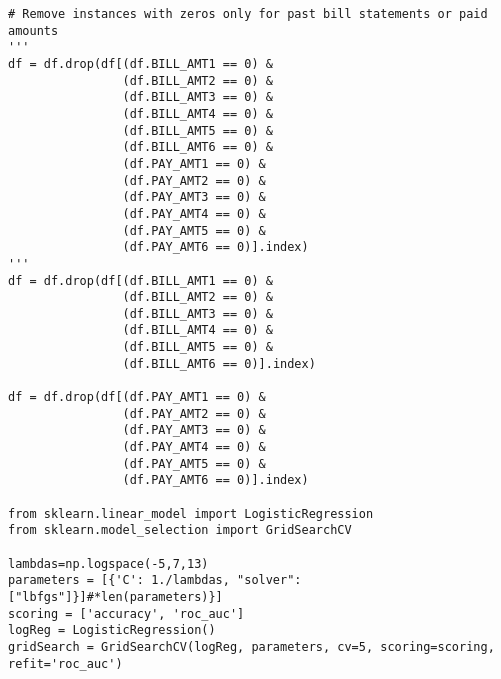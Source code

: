 \documentclass[%
oneside,                 %
final,                   %
10pt]{article}
\begin{document}
\begin{verbatim}
# Remove instances with zeros only for past bill statements or paid amounts
'''
df = df.drop(df[(df.BILL_AMT1 == 0) &
                (df.BILL_AMT2 == 0) &
                (df.BILL_AMT3 == 0) &
                (df.BILL_AMT4 == 0) &
                (df.BILL_AMT5 == 0) &
                (df.BILL_AMT6 == 0) &
                (df.PAY_AMT1 == 0) &
                (df.PAY_AMT2 == 0) &
                (df.PAY_AMT3 == 0) &
                (df.PAY_AMT4 == 0) &
                (df.PAY_AMT5 == 0) &
                (df.PAY_AMT6 == 0)].index)
'''
df = df.drop(df[(df.BILL_AMT1 == 0) &
                (df.BILL_AMT2 == 0) &
                (df.BILL_AMT3 == 0) &
                (df.BILL_AMT4 == 0) &
                (df.BILL_AMT5 == 0) &
                (df.BILL_AMT6 == 0)].index)

df = df.drop(df[(df.PAY_AMT1 == 0) &
                (df.PAY_AMT2 == 0) &
                (df.PAY_AMT3 == 0) &
                (df.PAY_AMT4 == 0) &
                (df.PAY_AMT5 == 0) &
                (df.PAY_AMT6 == 0)].index)

from sklearn.linear_model import LogisticRegression
from sklearn.model_selection import GridSearchCV

lambdas=np.logspace(-5,7,13)
parameters = [{'C': 1./lambdas, "solver":["lbfgs"]}]#*len(parameters)}]
scoring = ['accuracy', 'roc_auc']
logReg = LogisticRegression()
gridSearch = GridSearchCV(logReg, parameters, cv=5, scoring=scoring, refit='roc_auc') 
\end{verbatim}
\end{document}
